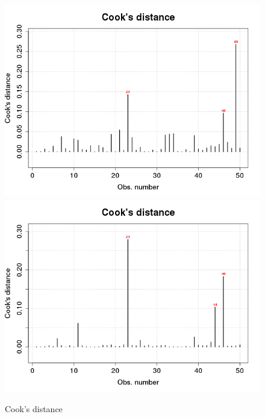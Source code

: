 \begin{figure}[p]
\begin{center}
    \includegraphics[scale=0.4]{imgOT/model1-drawCookDistance.png}\hspace*{1cm}
	\includegraphics[scale=0.4]{imgOT/model2-drawCookDistance.png}\\
  \end{center}
  \caption{Cook's distance}
\end{figure}

